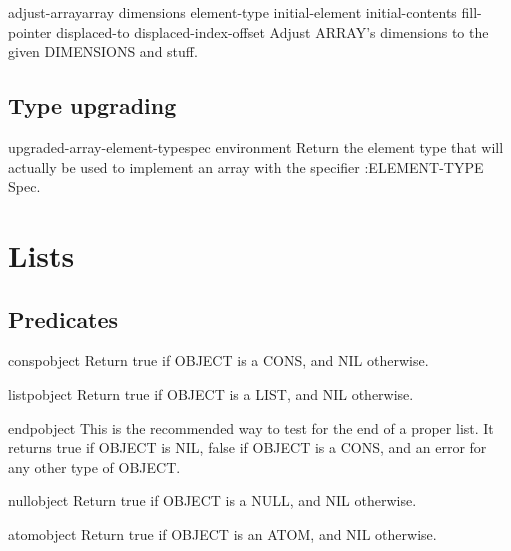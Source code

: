 \documentclass[10pt,english]{book}
\begin{document}
\begin{function}{adjust-array}{array dimensions \key element-type initial-element initial-contents
 fill-pointer displaced-to displaced-index-offset}
  Adjust ARRAY's dimensions to the given DIMENSIONS and stuff.
\end{function}

\section{Type upgrading}
\label{sec:type-upgrading}

\begin{function}{upgraded-array-element-type}{spec \op environment}
  Return the element type that will actually be used to implement an array
   with the specifier :ELEMENT-TYPE Spec.
\end{function}


\chapter{Lists}
\label{cha:lists}

\section{Predicates}
\label{sec:list-predicates}

\begin{function}{consp}{object}
  Return true if OBJECT is a CONS, and NIL otherwise.
\end{function}

\begin{function}{listp}{object}
  Return true if OBJECT is a LIST, and NIL otherwise.
\end{function}

\begin{function}{endp}{object}
  This is the recommended way to test for the end of a proper list. It
  returns true if OBJECT is NIL, false if OBJECT is a CONS, and an error
  for any other type of OBJECT.
\end{function}

\begin{function}{null}{object}
  Return true if OBJECT is a NULL, and NIL otherwise.
\end{function}

\begin{function}{atom}{object}
  Return true if OBJECT is an ATOM, and NIL otherwise.
\end{function}
\end{document}
